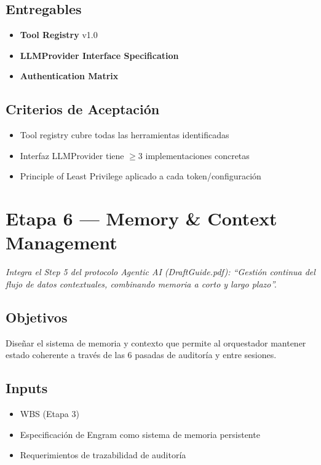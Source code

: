 \documentclass[12pt,a4paper]{article}
\begin{document}
\subsection*{Entregables}
\begin{itemize}
  \item \textbf{Tool Registry} v1.0
  \item \textbf{LLMProvider Interface Specification}
  \item \textbf{Authentication Matrix}
\end{itemize}

\subsection*{Criterios de Aceptación}
\begin{itemize}
  \item[{${[\;]}$}] Tool registry cubre todas las herramientas identificadas
  \item[{${[\;]}$}] Interfaz LLMProvider tiene $\geq$3 implementaciones concretas
  \item[{${[\;]}$}] Principle of Least Privilege aplicado a cada token/configuración
\end{itemize}

\section{Etapa 6 --- Memory \& Context Management}

\emph{Integra el Step 5 del protocolo Agentic AI (DraftGuide.pdf): ``Gestión continua del flujo de datos contextuales, combinando memoria a corto y largo plazo''.}

\subsection*{Objetivos}
Diseñar el sistema de memoria y contexto que permite al orquestador mantener estado coherente a través de las 6 pasadas de auditoría y entre sesiones.

\subsection*{Inputs}
\begin{itemize}
  \item WBS (Etapa 3)
  \item Especificación de Engram como sistema de memoria persistente
  \item Requerimientos de trazabilidad de auditoría
\end{itemize}
\end{document}
